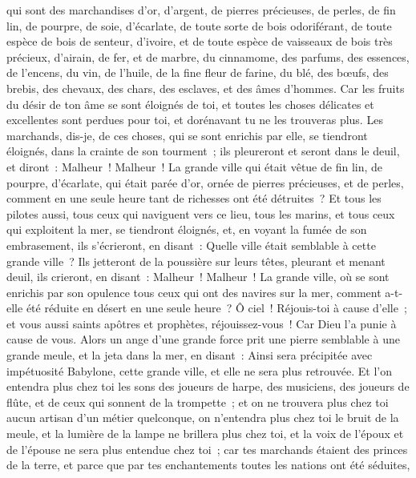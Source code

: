 \begin{multicols}{2}
qui sont des marchandises d'or, d'argent, de pierres précieuses, de perles, de fin lin, de pourpre, de soie, d'écarlate, de toute sorte de bois odoriférant, de toute espèce de bois de senteur, d'ivoire, et de toute espèce de vaisseaux de bois très précieux, d'airain, de fer, et de marbre,
du cinnamome, des parfums, des essences, de l'encens, du vin, de l'huile, de la fine fleur de farine, du blé, des bœufs, des brebis, des chevaux, des chars, des esclaves, et des âmes d'hommes.
Car les fruits du désir de ton âme se sont éloignés de toi, et toutes les choses délicates et excellentes sont perdues pour toi, et dorénavant tu ne les trouveras plus.
Les marchands, dis-je, de ces choses, qui se sont enrichis par elle, se tiendront éloignés, dans la crainte de son tourment~; ils pleureront et seront dans le deuil,
et diront~: Malheur~! Malheur~! La grande ville qui était vêtue de fin lin, de pourpre, d'écarlate, qui était parée d'or, ornée de pierres précieuses, et de perles, comment en une seule heure tant de richesses ont été détruites~?
Et tous les pilotes aussi, tous ceux qui naviguent vers ce lieu, tous les marins, et tous ceux qui exploitent la mer, se tiendront éloignés,
et, en voyant la fumée de son embrasement, ils s'écrieront, en disant~: Quelle ville était semblable à cette grande ville~?
Ils jetteront de la poussière sur leurs têtes, pleurant et menant deuil, ils crieront, en disant~: Malheur~! Malheur~! La grande ville, où se sont enrichis par son opulence tous ceux qui ont des navires sur la mer, comment a-t-elle été réduite en désert en une seule heure~?
Ô ciel~! Réjouis-toi à cause d'elle~; et vous aussi saints apôtres et prophètes, réjouissez-vous~! Car Dieu l'a punie à cause de vous.
Alors un ange d'une grande force prit une pierre semblable à une grande meule, et la jeta dans la mer, en disant~: Ainsi sera précipitée avec impétuosité Babylone, cette grande ville, et elle ne sera plus retrouvée.
Et l'on entendra plus chez toi les sons des joueurs de harpe, des musiciens, des joueurs de flûte, et de ceux qui sonnent de la trompette~; et on ne trouvera plus chez toi aucun artisan d'un métier quelconque, on n'entendra plus chez toi le bruit de la meule,
et la lumière de la lampe ne brillera plus chez toi, et la voix de l'époux et de l'épouse ne sera plus entendue chez toi~; car tes marchands étaient des princes de la terre, et parce que par tes enchantements toutes les nations ont été séduites,

\end{multicols}
